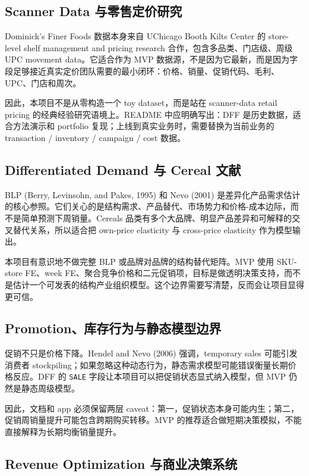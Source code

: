 \documentclass[UTF8,11pt,a4paper,fontset=none]{ctexart}
\begin{document}
\subsection{Scanner Data 与零售定价研究}

Dominick's Finer Foods 数据本身来自 UChicago Booth Kilts Center 的 store-level shelf management and pricing research 合作，包含多品类、门店级、周级 UPC movement data。它适合作为 MVP 数据源，不是因为它最新，而是因为字段足够接近真实定价团队需要的最小闭环：价格、销量、促销代码、毛利、UPC、门店和周次。

因此，本项目不是从零构造一个 toy dataset，而是站在 scanner-data retail pricing 的经典经验研究语境上。README 中应明确写出：DFF 是历史数据，适合方法演示和 portfolio 复现；上线到真实业务时，需要替换为当前业务的 transaction / inventory / campaign / cost 数据。

\subsection{Differentiated Demand 与 Cereal 文献}

BLP (Berry, Levinsohn, and Pakes, 1995) 和 Nevo (2001) 是差异化产品需求估计的核心参照。它们关心的是结构需求、产品替代、市场势力和价格-成本边际，而不是简单预测下周销量。Cereals 品类有多个大品牌、明显产品差异和可解释的交叉替代关系，所以适合把 own-price elasticity 与 cross-price elasticity 作为模型输出。

本项目有意识地不做完整 BLP 或品牌对品牌的结构替代矩阵。MVP 使用 SKU-store FE、week FE、聚合竞争价格和二元促销项，目标是做透明决策支持，而不是估计一个可发表的结构产业组织模型。这个边界需要写清楚，反而会让项目显得更可信。

\subsection{Promotion、库存行为与静态模型边界}

促销不只是价格下降。Hendel and Nevo (2006) 强调，temporary sales 可能引发消费者 stockpiling；如果忽略这种动态行为，静态需求模型可能错误衡量长期价格反应。DFF 的 \texttt{SALE} 字段让本项目可以把促销状态显式纳入模型，但 MVP 仍然是静态周级模型。

因此，文档和 app 必须保留两层 caveat：第一，促销状态本身可能内生；第二，促销周销量提升可能包含跨期购买转移。MVP 的推荐适合做短期决策模拟，不能直接解释为长期均衡销量提升。

\subsection{Revenue Optimization 与商业决策系统}
\end{document}
